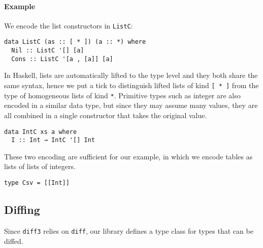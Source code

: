 \documentclass{sigplanconf}
\theoremstyle{plain}
\begin{document}
\paragraph{Example}
We encode the list constructors in \texttt{ListC}:
\begin{verbatim}
data ListC (as :: [ * ]) (a :: *) where
  Nil :: ListC '[] [a]
  Cons :: ListC '[a , [a]] [a]
\end{verbatim}
In Haskell, lists are automatically lifted to the type level and they
both share the same syntax, hence we put a tick to distinguish lifted
lists of kind \texttt{[ * ]} from the type of homogeneous lists of kind \texttt{*}.
%
Primitive types such as integer are also encoded in a similar data
type, but since they may assume many values, they are all combined in
a single constructor that takes the original value.
\begin{verbatim}
data IntC xs a where
  I :: Int → IntC '[] Int
\end{verbatim}

These two encoding are sufficient for our example, in
which we encode tables as lists of lists of integers.
\begin{verbatim}
type Csv = [[Int]]
\end{verbatim} 

\subsection{Diffing}
Since \texttt{diff3} relies on \texttt{diff}, our library
defines a type class for types that can be diffed.
\end{document}
